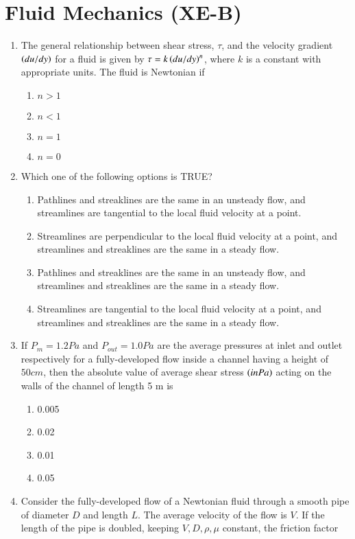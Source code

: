 \documentclass[journal]{IEEEtran}
\begin{document}
\section*{Fluid Mechanics (XE-B)}
\begin{enumerate}[start=1]
\item The general relationship between shear stress, $\tau$, and the velocity gradient $\left(du/dy\right)$ for a fluid is given by $\tau = k\left(du/dy\right)^n$, where $k$ is a constant with appropriate units. The fluid is Newtonian if
\begin{enumerate}
    \item $n > 1$
    \item $n < 1$
    \item $n = 1$
    \item $n = 0$
\end{enumerate}
\item Which one of the following options is TRUE?
\begin{enumerate}
    \item Pathlines and streaklines are the same in an unsteady flow, and streamlines are tangential to the local fluid velocity at a point.
    \item Streamlines are perpendicular to the local fluid velocity at a point, and streamlines and streaklines are the same in a steady flow.
    \item Pathlines and streaklines are the same in an unsteady flow, and streamlines and streaklines are the same in a steady flow.
    \item Streamlines are tangential to the local fluid velocity at a point, and streamlines and streaklines are the same in a steady flow.
    \end{enumerate}
\item If $P_m = 1.2 Pa$ and $P_{out} =1.0 Pa$ are the average pressures at inlet and outlet
respectively for a fully-developed flow inside a channel having a height of $50 cm$, then the absolute value of average shear stress $\left(in Pa\right)$ acting on the walls of the channel of length 5 m is
\begin{enumerate}
    \item 0.005
    \item 0.02
    \item 0.01
    \item 0.05
\end{enumerate}
\item Consider the fully-developed flow of a Newtonian fluid  through a smooth pipe of diameter $D$ and length $L$. The average velocity of the flow is $V$. If the length of the pipe is doubled, keeping $V,D,\rho,\mu$ constant, the friction factor

\end{enumerate}
\end{document}
